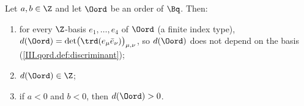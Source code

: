 Let $a,b\in\Z$ and let $\Oord$ be an order of $\Bq$. Then:
\begin{enumerate}[label=(\alph*)]
\item for every $\Z$-basis $e_1,\dots,e_4$ of $\Oord$ (a finite index type), $d(\Oord)=\det\bigl(\trd(e_\mu\bar e_\nu)\bigr)_{\mu,\nu}$, so $d(\Oord)$ does not depend on the basis
  (\cref{III.qord.def:discriminant});
\item $d(\Oord)\in\Z$;
\item if $a<0$ and $b<0$, then $d(\Oord)>0$.
\end{enumerate}
